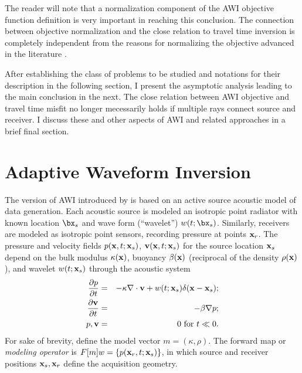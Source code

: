 The reader will
note that a normalization component of the AWI objective function
definition is very
important in reaching this conclusion. The connection between
objective normalization and the close relation to travel time
inversion is completely independent from 
the reasons for normalizing the objective advanced in the
literature \cite[]{Warner:16,LiAlkhalifah:21}.

After establishing
the class of problems to be studied and notations for their
description in the following section, I present the asymptotic
analysis leading to the main conclusion in the next. The close relation
between AWI objective and travel time misfit no longer mecessarily
holds if multiple rays connect source and receiver. I discuss these
and other aspects of AWI and related approaches in a brief final section.

\section{Adaptive Waveform Inversion}

The version of AWI introduced by \cite{Warner:16} is based on an
active source acoustic model of data generation. Each acoustic source
is modeled an isotropic point radiator with known location $\bx_s$ and
wave form (``wavelet'') $w(t;\bx_s)$. Similarly, receivers are modeled
as isotropic point sensors, recording pressure at points ${\bf x}_r$. The pressure and velocity fields $p({\bf x},t;{\bf x}_s)$, ${\bf v}({\bf x},t;{\bf x}_s)$ for the source location ${\bf x}_s$ depend on the bulk modulus $\kappa({\bf x})$, buoyancy $\beta({\bf x})$ (reciprocal of the density $\rho({\bf x})$), and wavelet $w(t;{\bf x}_s)$ through the acoustic system
\begin{eqnarray}
  \label{eqn:awe}
 \frac{\partial p}{\partial t} & = &- \kappa \nabla \cdot {\bf v} +
w(t;{\bf x}_s) \delta({\bf x}-{\bf x}_s); \nonumber \\
\frac{\partial {\bf v}}{\partial t} & = & - \beta \nabla p; \\ 
p, {\bf v} & = & 0 \mbox{ for }  t \ll 0.
\end{eqnarray}
For sake of brevity, define the model vector $m=(\kappa,\rho)$. The forward map or {\em modeling operator} is $F[m]w = \{p({\bf x}_r,t;{\bf x}_s)\}$, in which source and receiver positions ${\bf x}_s, {\bf x}_r$ define the acquisition geometry.

